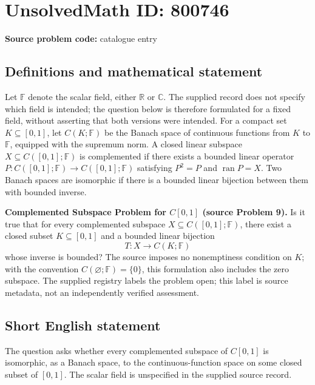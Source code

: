 \documentclass[11pt]{article}
\newcommand{\R}{\mathbb{R}}
\newcommand{\C}{\mathbb{C}}
\begin{document}
\section*{UnsolvedMath ID: 800746}
\textbf{Source problem code:} catalogue entry
\subsection{Definitions and mathematical statement}
Let \(\mathbb{F}\) denote the scalar field, either \(\R\) or \(\C\). The supplied record does not specify which field is intended; the question below is therefore formulated for a fixed field, without asserting that both versions were intended. For a compact set \(K\subseteq[0,1]\), let \(C(K;\mathbb{F})\) be the Banach space of continuous functions from \(K\) to \(\mathbb{F}\), equipped with the supremum norm. A closed linear subspace \(X\subseteq C([0,1];\mathbb{F})\) is complemented if there exists a bounded linear operator \(P:C([0,1];\mathbb{F})\to C([0,1];\mathbb{F})\) satisfying \(P^2=P\) and \(\operatorname{ran}P=X\). Two Banach spaces are isomorphic if there is a bounded linear bijection between them with bounded inverse.

\textbf{Complemented Subspace Problem for \(C[0,1]\) (source Problem 9).} Is it true that for every complemented subspace \(X\subseteq C([0,1];\mathbb{F})\), there exist a closed subset \(K\subseteq[0,1]\) and a bounded linear bijection
\[
T:X\longrightarrow C(K;\mathbb{F})
\]
whose inverse is bounded? The source imposes no nonemptiness condition on \(K\); with the convention \(C(\varnothing;\mathbb{F})=\{0\}\), this formulation also includes the zero subspace. The supplied registry labels the problem open; this label is source metadata, not an independently verified assessment.
\subsection{Short English statement}
The question asks whether every complemented subspace of \(C[0,1]\) is isomorphic, as a Banach space, to the continuous-function space on some closed subset of \([0,1]\). The scalar field is unspecified in the supplied source record.
\end{document}
